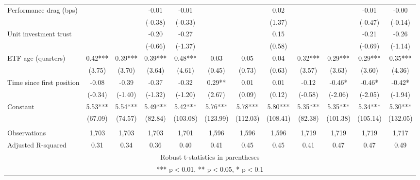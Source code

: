 \documentclass[]{article}
\begin{document}
\begin{tabular}{lccccccccccc}
Performance drag (bps) &  &  & -0.01 & -0.01 &  &  & 0.02 &  &  & -0.01 & -0.00 \\
 &  &  & (-0.38) & (-0.33) &  &  & (1.37) &  &  & (-0.47) & (-0.14) \\
Unit investment trust &  &  & -0.20 & -0.27 &  &  & 0.15 &  &  & -0.21 & -0.26 \\
 &  &  & (-0.66) & (-1.37) &  &  & (0.58) &  &  & (-0.69) & (-1.14) \\
ETF age (quarters) & 0.42*** & 0.39*** & 0.39*** & 0.48*** & 0.03 & 0.05 & 0.04 & 0.32*** & 0.29*** & 0.29*** & 0.35*** \\
 & (3.75) & (3.70) & (3.64) & (4.61) & (0.45) & (0.73) & (0.63) & (3.57) & (3.63) & (3.60) & (4.36) \\
Time since first position & -0.08 & -0.39 & -0.37 & -0.32 & 0.29** & 0.01 & 0.01 & -0.12 & -0.46* & -0.46* & -0.42* \\
 & (-0.34) & (-1.40) & (-1.32) & (-1.20) & (2.67) & (0.09) & (0.12) & (-0.58) & (-2.06) & (-2.05) & (-1.94) \\
Constant & 5.53*** & 5.54*** & 5.49*** & 5.42*** & 5.76*** & 5.78*** & 5.80*** & 5.35*** & 5.35*** & 5.34*** & 5.30*** \\
 & (67.09) & (74.57) & (82.84) & (103.08) & (123.99) & (112.03) & (108.41) & (82.38) & (101.38) & (105.14) & (132.05) \\
 &  &  &  &  &  &  &  &  &  &  &  \\
Observations & 1,703 & 1,703 & 1,703 & 1,701 & 1,596 & 1,596 & 1,596 & 1,719 & 1,719 & 1,719 & 1,717 \\
 Adjusted R-squared & 0.31 & 0.34 & 0.36 & 0.40 & 0.41 & 0.45 & 0.45 & 0.41 & 0.47 & 0.47 & 0.49 \\ \hline
\multicolumn{12}{c}{ Robust t-statistics in parentheses} \\
\multicolumn{12}{c}{ *** p$<$0.01, ** p$<$0.05, * p$<$0.1} \\
\end{tabular}
\end{document}
